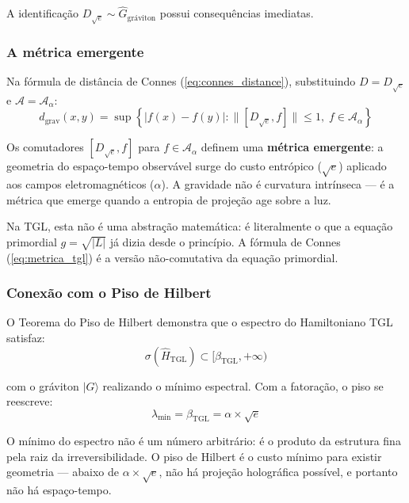 \documentclass[12pt,a4paper,twoside]{article}
\newcommand{\betatgl}{\beta_{\!\scriptscriptstyle\mathrm{TGL}}}
\begin{document}
A identificação $D_{\sqrt{e}} \sim \hat{G}_{\text{gráviton}}$ possui consequências imediatas.

\subsubsection{A métrica emergente}

Na fórmula de distância de Connes (\ref{eq:connes_distance}), substituindo $D = D_{\sqrt{e}}$ e $\mathcal{A} = \mathcal{A}_\alpha$:
\begin{equation}
d_{\text{grav}}(x,y) = \sup\left\{|f(x) - f(y)| : \|[D_{\sqrt{e}}, f]\| \leq 1,\; f \in \mathcal{A}_\alpha\right\}
\label{eq:metrica_tgl}
\end{equation}

Os comutadores $[D_{\sqrt{e}}, f]$ para $f \in \mathcal{A}_\alpha$ definem uma \textbf{métrica emergente}: a geometria do espaço-tempo observável surge do custo entrópico ($\sqrt{e}$) aplicado aos campos eletromagnéticos ($\alpha$). A gravidade não é curvatura intrínseca --- é a métrica que emerge quando a entropia de projeção age sobre a luz.

Na TGL, esta não é uma abstração matemática: é literalmente o que a equação primordial $g = \sqrt{|L|}$ já dizia desde o princípio. A fórmula de Connes (\ref{eq:metrica_tgl}) é a versão não-comutativa da equação primordial.

\subsubsection{Conexão com o Piso de Hilbert}

O Teorema do Piso de Hilbert \cite{Miguel2026Graviton} demonstra que o espectro do Hamiltoniano TGL satisfaz:
\begin{equation}
\sigma(\hat{H}_{\text{TGL}}) \subset [\betatgl, +\infty)
\end{equation}

\noindent com o gráviton $|G\rangle$ realizando o mínimo espectral. Com a fatoração, o piso se reescreve:
\begin{equation}
\lambda_{\min} = \betatgl = \alpha \times \sqrt{e}
\end{equation}

O mínimo do espectro não é um número arbitrário: é o produto da estrutura fina pela raiz da irreversibilidade. O piso de Hilbert é o custo mínimo para existir geometria --- abaixo de $\alpha \times \sqrt{e}$, não há projeção holográfica possível, e portanto não há espaço-tempo.
\end{document}
